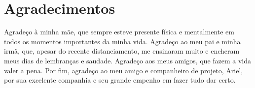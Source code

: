\chapter*{Agradecimentos}

Agradeço à minha mãe, que sempre esteve presente física e mentalmente em todos os momentos importantes da minha vida. Agradeço ao meu pai e minha irmã, que, apesar do recente distanciamento, me ensinaram muito e encheram meus dias de lembranças e saudade. Agradeço aos meus amigos, que fazem a vida valer a pena. Por fim, agradeço ao meu amigo e companheiro de projeto, Ariel, por sua excelente companhia e seu grande empenho em fazer tudo dar certo.